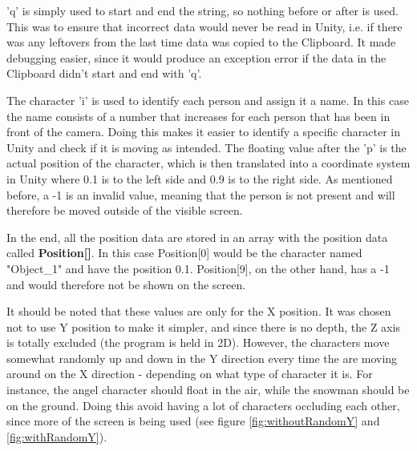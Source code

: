 'q' is simply used to start and end the string, so nothing before or after is used. This was to ensure that incorrect data would never be read in Unity, i.e. if there was any leftovers from the last time data was copied to the Clipboard. It made debugging easier, since it would produce an exception error if the data in the Clipboard didn't start and end with 'q'.

The character 'i' is used to identify each person and assign it a name. In this case the name consists of a number that increases for each person that has been in front of the camera. Doing this makes it easier to identify a specific character in Unity and check if it is moving as intended. The floating value after the 'p' is the actual position of the character, which is then translated into a coordinate system in Unity where 0.1 is to the left side and 0.9 is to the right side. As mentioned before, a -1 is an invalid value, meaning that the person is not present and will therefore be moved outside of the visible screen.

In the end, all the position data are stored in an array with the position data called \textbf{Position[]}. In this case Position[0] would be the character named "Object\_1" and have the position 0.1. Position[9], on the other hand, has a -1 and would therefore not be shown on the screen.

It should be noted that these values are only for the X position. It was chosen not to use Y position to make it simpler, and since there is no depth, the Z axis is totally excluded (the program is held in 2D). However, the characters move somewhat randomly up and down in the Y direction every time the are moving around on the X direction - depending on what type of character it is. For instance, the angel character should float in the air, while the snowman should be on the ground. Doing this avoid having a lot of characters occluding each other, since more of the screen is being used (see figure \ref{fig:withoutRandomY} and \ref{fig:withRandomY}).

